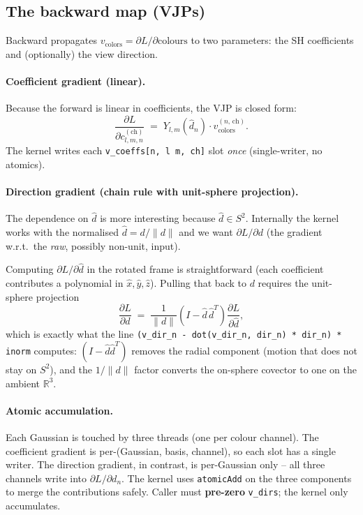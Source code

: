 \documentclass[11pt]{article}
\newcommand{\R}{\mathbb{R}}
\begin{document}
\subsection{The backward map (VJPs)}

Backward propagates $v_{\text{colors}} = \partial L / \partial \text{colours}$
to two parameters: the SH coefficients and (optionally) the view
direction.

\paragraph{Coefficient gradient (linear).}
Because the forward is linear in coefficients, the VJP is closed
form:
\begin{equation}
  \frac{\partial L}{\partial c_{l,m,n}^{(\text{ch})}}
  \;=\;
  Y_{l,m}(\hat d_n) \cdot v_{\text{colors}}^{(n,\, \text{ch})}.
\end{equation}
The kernel writes each \texttt{v\_coeffs[n, l m, ch]} slot \emph{once}
(single-writer, no atomics).

\paragraph{Direction gradient (chain rule with unit-sphere projection).}
The dependence on $\hat d$ is more interesting because $\hat d \in S^{2}$.
Internally the kernel works with the normalised
$\hat d = d / \lVert d \rVert$ and we want $\partial L / \partial d$
(the gradient w.r.t.\ the \emph{raw}, possibly non-unit, input).

Computing $\partial L / \partial \hat d$ in the rotated frame is
straightforward (each coefficient contributes a polynomial in
$\hat x, \hat y, \hat z$). Pulling that back to $d$ requires the
unit-sphere projection
\begin{equation}
  \frac{\partial L}{\partial d}
  \;=\;
  \frac{1}{\lVert d \rVert}
  \left(I - \hat d\, \hat d^{T}\right)
  \frac{\partial L}{\partial \hat d},
  \label{eq:sphere-projection}
\end{equation}
which is exactly what the line
\texttt{(v\_dir\_n - dot(v\_dir\_n, dir\_n) * dir\_n) * inorm}
computes: $(I - \hat d \hat d^{T})$ removes the radial component
(motion that does not stay on $S^{2}$), and the $1/\lVert d \rVert$
factor converts the on-sphere covector to one on the ambient
$\R^{3}$.

\paragraph{Atomic accumulation.}
Each Gaussian is touched by three threads (one per colour channel).
The coefficient gradient is per-(Gaussian, basis, channel), so each
slot has a single writer. The direction gradient, in contrast, is
per-Gaussian only -- all three channels write into
$\partial L / \partial d_n$. The kernel uses \texttt{atomicAdd} on the
three components to merge the contributions safely. Caller must
\textbf{pre-zero} \texttt{v\_dirs}; the kernel only accumulates.
\end{document}
